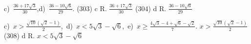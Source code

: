 
c)~\(\frac{36+17\sqrt 3}{30}\),\quad d)~\(\frac{36-10\sqrt 6}{29}\).
(303) c R. \(\frac{36+17\sqrt 3}{30}\) (304) d R. \(\frac{36-10\sqrt 6}{29}\)

c)~\(x>\frac{\sqrt{10}(\sqrt 2-1)} 2\),\, d)~\(x<5\sqrt 3-\sqrt 6\),\, e)~\(x\ge 
\frac{4\sqrt 3-4+\sqrt 6-\sqrt 2} 7\).
\(x>\frac{\sqrt{10}(\sqrt 2-1)} 2\) (308) d R. \(x<5\sqrt 3-\sqrt 6\)


